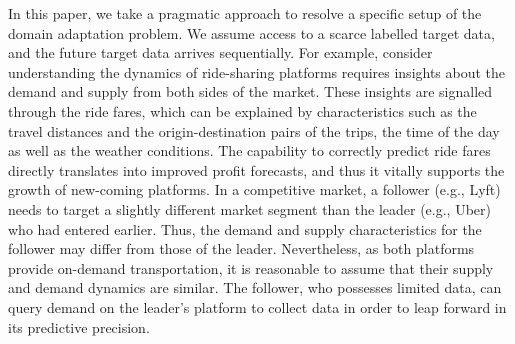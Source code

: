 \documentclass{article}
\begin{document}
%     
% 
%   
%   
    In this paper, we take a pragmatic approach to resolve a specific setup of the domain adaptation problem. We assume access to a scarce labelled target data, and the future target data arrives sequentially.
    For example, consider understanding the dynamics of ride-sharing platforms requires insights about the demand and supply from both sides of the market. These insights are signalled through the ride fares, which can be explained by characteristics such as the travel distances and the origin-destination pairs of the trips, the time of the day as well as the weather conditions. The capability to correctly predict ride fares directly translates into improved profit forecasts, and thus it vitally supports the growth of new-coming platforms. In a competitive market, a follower (e.g., Lyft) needs to target a slightly different market segment than the leader (e.g., Uber) who had entered earlier. Thus, the demand and supply characteristics for the follower may differ from those of the leader. Nevertheless, as both platforms provide on-demand transportation, it is reasonable to assume that their supply and demand dynamics are similar. The follower, who possesses limited data, can query demand on the leader’s platform to collect data in order to leap forward in its predictive precision.
\end{document}
